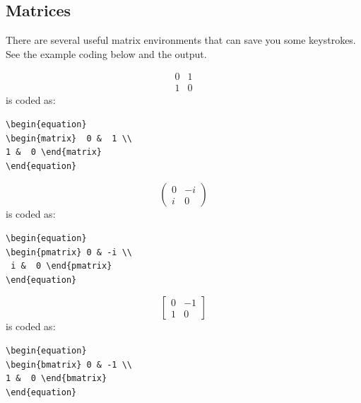 \documentclass[lettersize,journal]{IEEEtran}
\begin{document}
\subsection{Matrices}
\noindent There are several useful matrix environments that can save you some keystrokes. See the example coding below and the output.

\begin{equation}
\begin{matrix}  0 &  1 \\ 
1 &  0 \end{matrix}
\end{equation}
is coded as:
\begin{verbatim}
\begin{equation}
\begin{matrix}  0 &  1 \\ 
1 &  0 \end{matrix}
\end{equation}
\end{verbatim}

\begin{equation}
\begin{pmatrix} 0 & -i \\
 i &  0 \end{pmatrix}
\end{equation}
is coded as:
\begin{verbatim}
\begin{equation}
\begin{pmatrix} 0 & -i \\
 i &  0 \end{pmatrix}
\end{equation}
\end{verbatim}

\begin{equation}
\begin{bmatrix} 0 & -1 \\ 
1 &  0 \end{bmatrix}
\end{equation}
is coded as:
\begin{verbatim}
\begin{equation}
\begin{bmatrix} 0 & -1 \\ 
1 &  0 \end{bmatrix}
\end{equation}
\end{verbatim}
\end{document}
